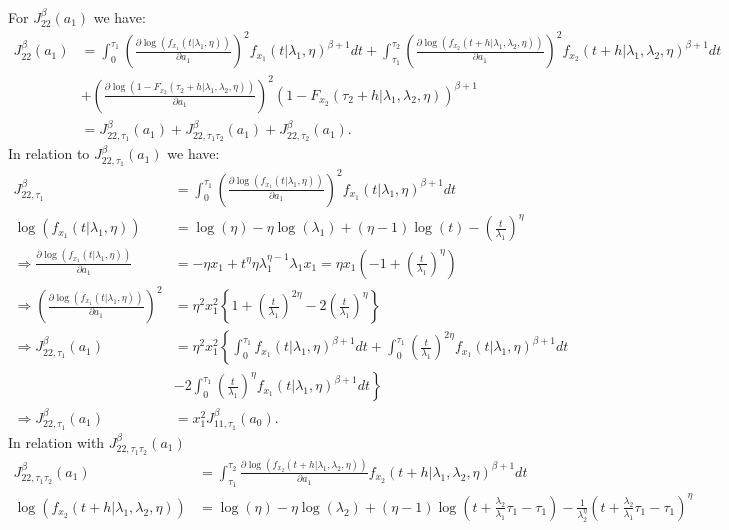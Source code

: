 \documentclass{article}
\begin{document}
For $J_{22}^{\beta}(a_1)$ we have:
\begin{align}
J_{22}^{\beta}(a_1)&=\int_{0}^{\tau_1}\left(\frac{\partial \log\left(f_{x_1}(t|\lambda_1,\eta)\right)}{\partial a_1}\right)^2 f_{x_1}(t|\lambda_1,\eta)^{\beta+1}dt+\int_{\tau_1}^{\tau_2}\left(\frac{\partial \log\left(f_{x_2}(t+h|\lambda_1,\lambda_2,\eta)\right)}{\partial a_1}\right)^2 f_{x_2}(t+h|\lambda_1,\lambda_2,\eta)^{\beta+1}dt \nonumber
\\
&+\left(\frac{\partial \log\left(1-F_{x_2}(\tau_2+h|\lambda_1,\lambda_2,\eta)\right)}{\partial a_1}\right)^2 \left(1-F_{x_2}(\tau_2+h|\lambda_1,\lambda_2,\eta)\right)^{\beta+1} \nonumber
\\
&=J_{22,\tau_1}^{\beta}(a_1)+J_{22,\tau_1 \tau_2}^{\beta} (a_1)+ J_{22,\tau_2}^{\beta}(a_1).
\label{eq:dev_F2_a0}
\end{align}
In relation to $J_{22,\tau_1}^{\beta}(a_1)$ we have:
\begin{align}
J_{22,\tau_1}^{\beta}&=\int_{0}^{\tau_1}\left(\frac{\partial \log\left(f_{x_1}(t|\lambda_1,\eta)\right)}{\partial a_1}\right)^2 f_{x_1}(t|\lambda_1,\eta)^{\beta+1}dt \nonumber
\\
\log\left(f_{x_1}(t|\lambda_1,\eta)\right)&=\log(\eta)-\eta\log(\lambda_1)+(\eta-1)\log(t)-\left(\frac{t}{\lambda_1}\right)^{\eta} \nonumber
 \\
 \Rightarrow \frac{\partial \log\left(f_{x_1}(t|\lambda_1,\eta)\right)}{\partial a_1}&=-\eta x_1+t^{\eta}\eta\lambda_1^{\eta-1}\lambda_1x_1=\eta x_1 \left(-1+\left(\frac{t}{\lambda_1}\right)^{\eta}\right) \nonumber
 \\ 
 \Rightarrow \left(\frac{\partial \log\left(f_{x_1}(t|\lambda_1,\eta)\right)}{\partial a_1}\right)^2&=\eta^2 x_1^2 \left\{1+\left(\frac{t}{\lambda_1}\right)^{2\eta}-2\left(\frac{t}{\lambda_1}\right)^{\eta}\right\} \nonumber
 \\
 \Rightarrow J_{22,\tau_1}^{\beta}(a_1)&=\eta^2 x_1^2\left\{\int_{0}^{\tau_1} f_{x_1}(t|\lambda_1,\eta)^{\beta+1}dt+\int_{0}^{\tau_1}\left(\frac{t}{\lambda_1}\right)^{2\eta} f_{x_1}(t|\lambda_1,\eta)^{\beta+1}dt  \right. \nonumber
 \\
 &\left. -2\int_{0}^{\tau_1} \left(\frac{t}{\lambda_1}\right)^{\eta}f_{x_1}(t|\lambda_1,\eta)^{\beta+1}dt\right\} \nonumber
 \\
 \Rightarrow J_{22,\tau_1}^{\beta}(a_1)&=x_1^2 J_{11,\tau_1}^{\beta}(a_0).
 \label{eq:dev_f1_a1}
\end{align}
In relation with $J_{22,\tau_1 \tau_2}^{\beta}(a_1)$
\begin{align*}
J_{22,\tau_1 \tau_2}^{\beta}(a_1)&=\int_{\tau_1}^{\tau_2}  \frac{\partial \log\left(f_{x_2}(t+h|\lambda_1,\lambda_2,\eta)\right)}{\partial a_1}f_{x_2}(t+h|\lambda_1,\lambda_2,\eta)^{\beta+1}dt
\\
\log\left(f_{x_2}(t+h|\lambda_1,\lambda_2,\eta)\right)&=\log(\eta)-\eta \log(\lambda_2)+(\eta-1)\log\left(t+\frac{\lambda_2}{\lambda_1}\tau_1-\tau_1\right)-\frac{1}{\lambda_2^{\eta}}\left(t+\frac{\lambda_2}{\lambda_1}\tau_1-\tau_1\right)^\eta
\end{align*}
\end{document}
